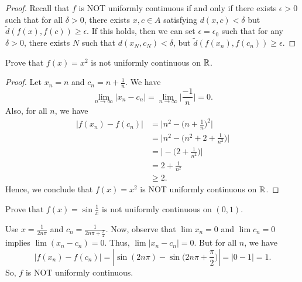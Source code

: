 \documentclass[a4paper]{article}
\begin{document}
\begin{proof}
    Recall that \( f  \) is NOT uniformly continuous if and only if there exists \( \epsilon > 0  \) such that for all \( \delta > 0  \), there exists \( x,c \in A   \) satisfying \( d(x,c) < \delta \) but \( \tilde{d}(f(x), f(c)) \geq \epsilon \). If this holds, then we can set \( \epsilon = {\epsilon}_{0} \) such that for any \( \delta > 0  \), there exists \( N  \) such that \( d({x}_{N}, {c}_{N}) < \delta \), but \( \tilde{d}(f({x}_{n}), f({c}_{n})) \geq \epsilon  \).
\end{proof}

\begin{eg}
    Prove that \( f(x) = x^{2} \) is not uniformly continuous on \( \mathbb{R}  \). 
\end{eg}
\begin{proof}
Let \( {x}_{n} = n  \) and \( {c}_{n} = n  + \frac{ 1 }{ n }  \). We have 
\[  \lim_{ n \to \infty  }  | {x}_{n} - {c}_{n} | = \lim_{ n \to \infty  }  \Big|  \frac{ -1 }{ n }  \Big| = 0. \]
Also, for all \( n  \), we have 
\begin{align*}
    | f({x}_{n}) - f({c}_{n}) | &= \Big| n^{2} - \Big(  n + \frac{ 1 }{ n }  \Big)^{2} \Big|   \\
                              &= \Big| n^{2} - \Big(n^{2} + 2 + \frac{ 1 }{ n^{2} }   \Big)  \Big| \\
                              &= \Big| - \Big(  2 + \frac{ 1 }{ n^{2} }  \Big) \Big| \\
                              &= 2 + \frac{ 1 }{ n^{2} } \\
                              &\geq 2.
\end{align*}
Hence, we conclude that \( f(x) = x^{2} \) is NOT uniformly continuous on \( \mathbb{R}  \).
\end{proof}

\begin{eg}
    Prove that \( f(x) = \sin \frac{ 1 }{ x }  \) is not uniformly continuous on \( (0,1) \). 
\end{eg}
\begin{solution}
Use \( x = \frac{ 1 }{ 2n \pi }  \) and \( {c}_{n} = \frac{ 1 }{ 2n \pi + \frac{ \pi }{ 2 }  }  \). Now, observe that \( \lim {x}_{n} = 0 \) and \( \lim {c}_{n} = 0  \) implies \( \lim ({x}_{n} - {c}_{n}) = 0 \). Thus, \( \lim | {x}_{n} - {c}_{n} |  = 0  \). But for all \( n  \), we have 
\[  | f({x}_{n}) - f({c}_{n}) |  = | \sin (2n \pi) - \sin \Big(2n \pi + \frac{ \pi }{ 2 }  \Big) | = | 0 - 1 | = 1.    \]
So, \( f \) is NOT uniformly continuous.
\end{solution}
\end{document}
